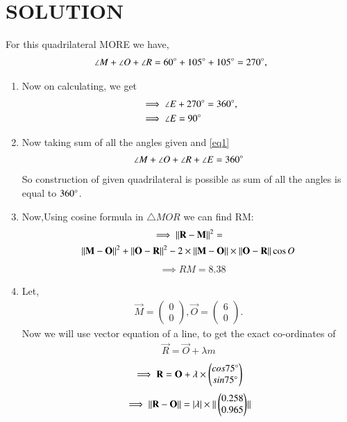 \documentclass[journal,12pt,twocolumn]{IEEEtran}
\newcommand{\myvec}[1]{\ensuremath{\begin{pmatrix}#1\end{pmatrix}}}
\begin{document}
\section{SOLUTION}
For this quadrilateral MORE we have,
\begin{align}
\angle M +\angle O +\angle R = 60\degree + 105\degree + 105\degree=270\degree,
\end{align}
\begin{enumerate}
    \item Now on calculating, we get
\begin{align}
&\implies \angle E + 270\degree  = 360\degree,
\\
&\implies \angle E = 90\degree\label{eq1}
\end{align}
 \item Now taking sum of all the angles given and \eqref{eq1}  
\begin{align}
\angle M + \angle O +\angle R +\angle E =360\degree
\end{align}
So construction of given quadrilateral is possible as sum of all the angles is equal to $360\degree$.\\
 \item Now,Using cosine formula in $\triangle MOR$ we can find RM:
\begin{multline}
\implies {\Vert\mathbf{R}-\mathbf{M}\rVert^2}=
\\
{\Vert\mathbf{M}-\mathbf{O}\rVert^2}+ \Vert\mathbf{O}-\mathbf{R}\rVert^2-2\times\Vert\mathbf{M}-\mathbf{O}\rVert \times \Vert\mathbf{O}-\mathbf{R}\rVert\cos{O}
\end{multline}
\begin{align}
&\implies RM=8.38
\end{align}
\item Let, \begin{align}
\vec{M}= \myvec{0\\0}, \vec{O}= \myvec{6\\0}.
\end{align}
Now we will use vector equation of a line, to get the exact co-ordinates of 
\begin{align}
    \vec{R}= \vec{O}+\lambda m
\end{align}
\begin{align}
   \implies \vec{R}= \vec{O}+ \lambda \times \myvec{cos75\degree \\ sin75\degree}
\end{align}
\begin{align}
    \implies {\norm{\vec{R}-\vec{O}}}= \abs{\lambda} \times{\norm{\myvec{0.258\\0.965}}}

\end{align}
\end{enumerate}
\end{document}
